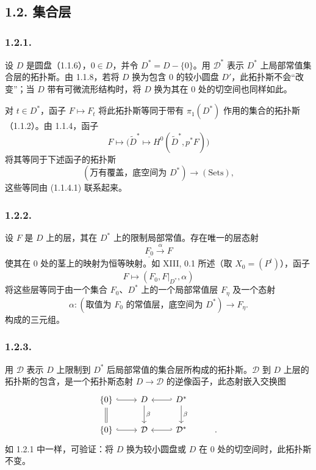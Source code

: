 \subsection*{1.2. 集合层}

\subsubsection*{1.2.1.}
设 $D$ 是圆盘（1.1.6），$0\in D$，并令 $D^*=D-\{0\}$。用 $\mathcal D^*$ 表示 $D^*$ 上局部常值集合层的拓扑斯。由 1.1.8，若将 $D$ 换为包含 $0$ 的较小圆盘 $D'$，此拓扑斯不会“改变”；当 $D$ 带有可微流形结构时，将 $D$ 换为其在 $0$ 处的切空间也同样如此。

对 $t\in D^*$，函子 $F\longmapsto F_t$ 将此拓扑斯等同于带有 $\pi_1(D^*)$ 作用的集合的拓扑斯（1.1.2）。由 1.1.4，函子
\[
F\longmapsto
\bigl(\widetilde D^*\longmapsto
H^0(\widetilde D^*,p^*F)\bigr)
\]
将其等同于下述函子的拓扑斯
\[
(\text{万有覆盖，底空间为 }D^*)
\longrightarrow(\mathrm{Sets}),
\]
这些等同由 (1.1.4.1) 联系起来。

\subsubsection*{1.2.2.}
设 $F$ 是 $D$ 上的层，其在 $D^*$ 上的限制局部常值。存在唯一的层态射
\[
\underline{F_0}\xrightarrow{\ \alpha\ }F
\]
使其在 $0$ 处的茎上的映射为恒等映射。如 XIII, 0.1 所述（取 $X_0=(P^t)$），函子
\[
F\longmapsto(F_0,F|_{D^*},\alpha)
\]
将这些层等同于由一个集合 $F_0$、$D^*$ 上的一个局部常值层 $F_\eta$ 及一个态射
\[
\alpha:
(\text{取值为 }F_0\text{ 的常值层，底空间为 }D^*)
\longrightarrow F_\eta.
\]
构成的三元组。

\subsubsection*{1.2.3.}
用 $\mathcal D$ 表示 $D$ 上限制到 $D^*$ 后局部常值的集合层所构成的拓扑斯。$\mathcal D$ 到 $D$ 上层的拓扑斯的包含，是一个拓扑斯态射 $D\longrightarrow\mathcal D$ 的逆像函子，此态射嵌入交换图
\[
\begin{tikzcd}
\{0\} \arrow[r, hook] \arrow[d, equal]
  & D \arrow[d, "\beta"]
  & D^* \arrow[l, hook'] \arrow[d, "\beta"] & {} \\
\{0\} \arrow[r, hook]
  & \mathcal D
  & \mathcal D^* \arrow[l, hook'] & {}.
\end{tikzcd}
\]
如 1.2.1 中一样，可验证：将 $D$ 换为较小圆盘或 $D$ 在 $0$ 处的切空间时，此拓扑斯不变。

